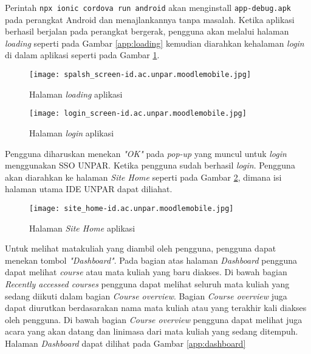 Perintah \texttt{npx ionic cordova run android} akan menginstall \texttt{app-debug.apk} pada perangkat Android dan menajlankannya tanpa masalah. Ketika aplikasi berhasil berjalan pada perangkat bergerak, pengguna akan melalui halaman \textit{loading} seperti pada Gambar \ref{app:loading} kemudian diarahkan kehalaman \textit{login} di dalam aplikasi seperti pada Gambar \ref{app:login}.


\begin{figure}[H]
\begin{minipage}{.5\textwidth} 
	\centering  
	\texttt{[image: spalsh\_screen-id.ac.unpar.moodlemobile.jpg]}  
	\caption[Halaman \textit{loading} aplikasi] {Halaman \textit{loading} aplikasi} 
	\label{app:loading} 
\end{minipage}
\begin{minipage}{.5\textwidth}
	\centering  
	\texttt{[image: login\_screen-id.ac.unpar.moodlemobile.jpg]}  
	\caption[Halaman \textit{login} aplikasi] {Halaman \textit{login} aplikasi} 
	\label{app:login} 
\end{minipage}
\end{figure}

Pengguna diharuskan menekan \textit{"OK"} pada \textit{pop-up} yang muncul untuk \textit{login} menggunakan SSO UNPAR. Ketika pengguna sudah berhasil \textit{login}. Pengguna akan diarahkan ke halaman \textit{Site Home} seperti pada Gambar \ref{app:site-home}, dimana isi halaman utama IDE UNPAR dapat diliahat. 

\begin{figure}[H] 
	\centering  
	\texttt{[image: site\_home-id.ac.unpar.moodlemobile.jpg]}  
	\caption[Halaman \textit{Site Home} aplikasi] {Halaman \textit{Site Home} aplikasi} 
	\label{app:site-home} 
\end{figure}  

Untuk melihat matakuliah yang diambil oleh pengguna, pengguna dapat menekan tombol \textit{"Dashboard"}. Pada bagian atas halaman \textit{Dashboard} pengguna dapat melihat \textit{course} atau mata kuliah yang baru diakses. Di bawah bagian \textit{Recently accessed courses} pengguna dapat melihat seluruh mata kuliah yang sedang diikuti dalam bagian \textit{Course overview}. Bagian \textit{Course overview} juga dapat diurutkan berdasarakan nama mata kuliah atau yang terakhir kali diakses oleh pengguna. Di bawah bagian \textit{Course overview} pengguna dapat melihat juga acara yang akan datang dan linimasa dari mata kuliah yang sedang ditempuh. Halaman \textit{Dashboard} dapat dilihat pada Gambar \ref{app:dashboard}

